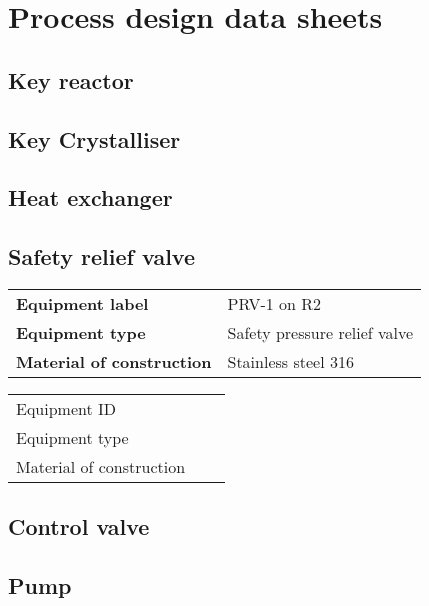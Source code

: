 \section{Process design data sheets}

\subsection{Key reactor}

\subsection{Key Crystalliser}

\subsection{Heat exchanger}

\subsection{Safety relief valve}

\begin{table}[H]
    \centering
    \begin{tabular}{@{}l|l@{}}
    \toprule
      \textbf{Equipment label}  & PRV-1 on R2\\
       \textbf{Equipment type}  & Safety pressure relief valve \\
       \textbf{Material of construction} & Stainless steel 316 \\
       \bottomrule
    \end{tabular}
\end{table}

\begin{table}[H]
    \centering
    \begin{tabular}{@{}l|l|l@{}}
    \toprule
       Equipment ID  &  \\
       Equipment type  &  \\
       Material of construction & \\
       \bottomrule
    \end{tabular}
\end{table}

\subsection{Control valve}

\subsection{Pump}

